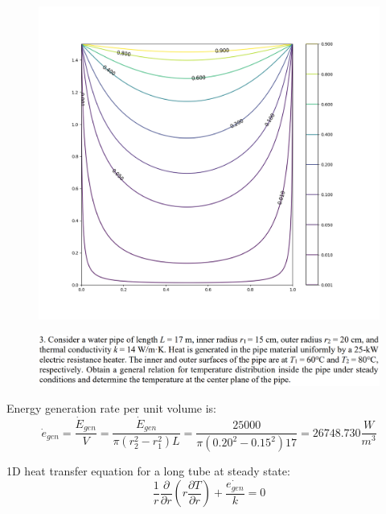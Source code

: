 \documentclass[conf]{new-aiaa}
\begin{document}
\begin{figure}[hbt!]
    \centering
    \includegraphics[width=1\textwidth]{plot/2D_conductionpng.png}
    \label{fig:2D_cond}
\end{figure}




%
%
%
%
\pagebreak 
\begin{figure}[hbt!]
    \centering
    \includegraphics[width=1\textwidth]{problems/p3.png}
    \label{fig:p3}
\end{figure}

\noindent Energy generation rate per unit volume is:
\begin{equation*}
    \dot{e}_{gen} = \frac{\dot{E}_{gen}}{V} = \frac{\dot{E}_{gen}}{\pi \left(r_2^2 - r_1^2\right) L}
    = \frac{25000}{\pi \left({0.20}^2 - {0.15}^2\right) 17}
    = 26748.730  \frac{W}{m^3}
\end{equation*}

\noindent 1D heat transfer equation for a long tube at steady state:
\begin{equation*}
    \frac{1}{r} \frac{\partial}{\partial r}\left(r \frac{\partial T}{\partial r}\right) + \frac{\dot{e_{gen}}}{k}= 0
\end{equation*}
\end{document}
